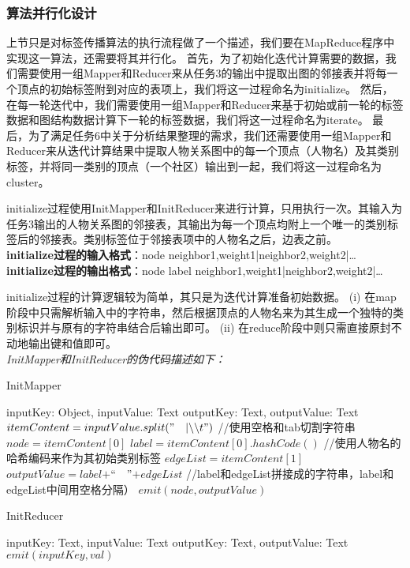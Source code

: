 \subsubsection{算法并行化设计}
上节只是对标签传播算法的执行流程做了一个描述，我们要在MapReduce程序中实现这一算法，还需要将其并行化。
首先，为了初始化迭代计算需要的数据，我们需要使用一组Mapper和Reducer来从任务3的输出中提取出图的邻接表并将每一个顶点的初始标签附到对应的表项上，我们将这一过程命名为initialize。
然后，在每一轮迭代中，我们需要使用一组Mapper和Reducer来基于初始或前一轮的标签数据和图结构数据计算下一轮的标签数据，我们将这一过程命名为iterate。
最后，为了满足任务6中关于分析结果整理的需求，我们还需要使用一组Mapper和Reducer来从迭代计算结果中提取人物关系图中的每一个顶点（人物名）及其类别标签，并将同一类别的顶点（一个社区）输出到一起，我们将这一过程命名为cluster。
\par
initialize过程使用InitMapper和InitReducer来进行计算，只用执行一次。其输入为任务3输出的人物关系图的邻接表，其输出为每一个顶点均附上一个唯一的类别标签后的邻接表。类别标签位于邻接表项中的人物名之后，边表之前。
\\ \textbf{initialize过程的输入格式}：node  neighbor1,weight1|neighbor2,weight2|\dots
\\ \textbf{initialize过程的输出格式}：node  label neighbor1,weight1|neighbor2,weight2|\dots
\par
initialize过程的计算逻辑较为简单，其只是为迭代计算准备初始数据。
(i) 在map阶段中只需解析输入中的字符串，然后根据顶点的人物名来为其生成一个独特的类别标识并与原有的字符串结合后输出即可。
(ii) 在reduce阶段中则只需直接原封不动地输出键和值即可。
\\
\emph{InitMapper和InitReducer的伪代码描述如下：}
\begin{algorithm}[H]
    \caption{InitMapper}
    \begin{algorithmic}[1]
        \REQUIRE inputKey: Object, inputValue: Text
        \ENSURE outputKey: Text, outputValue: Text
        \STATE $itemContent = inputValue.split("\quad|\backslash\backslash t")$ //使用空格和tab切割字符串
        \STATE $node = itemContent[0]$
        \STATE $label = itemContent[0].hashCode()$ //使用人物名的哈希编码来作为其初始类别标签
        \STATE $edgeList = itemContent[1]$
        \STATE $outputValue = label + “\quad” + edgeList$ //label和edgeList拼接成的字符串，label和edgeList中间用空格分隔）
        \STATE $emit(node, outputValue)$
    \end{algorithmic}
\end{algorithm}
\begin{algorithm}[H]
    \caption{InitReducer}
    \begin{algorithmic}[1]
        \REQUIRE inputKey: Text, inputValue: Text
        \ENSURE outputKey: Text, outputValue: Text
        \STATE $emit(inputKey, val)$
        \ENDFOR
    \end{algorithmic}
\end{algorithm}
